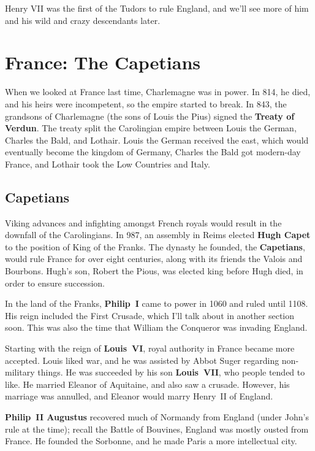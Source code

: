 Henry VII was the first of the Tudors to rule England,
and we'll see more of him and his wild and crazy descendants later.

\section{France: The Capetians}

When we looked at France last time, Charlemagne was in power.
In 814, he died, and his heirs were incompetent, so the empire started to break.
In 843, the grandsons of Charlemagne (the sons of Louis the Pius) signed the \textbf{Treaty of Verdun}.
The treaty split the Carolingian empire between Louis the German, Charles the Bald, and Lothair.
Louis the German received the east, which would eventually become the kingdom of Germany,
Charles the Bald got modern-day France,
and Lothair took the Low Countries and Italy.

\subsection*{Capetians}

Viking advances and infighting amongst French royals would result in the downfall of the Carolingians.
In 987, an assembly in Reims elected \textbf{Hugh Capet} to the position of King of the Franks.
The dynasty he founded, the \textbf{Capetians}, would rule France for over eight centuries,
along with its friends the Valois and Bourbons.
Hugh's son, Robert the Pious, was elected king before Hugh died, in order to ensure succession.

In the land of the Franks, \textbf{Philip~I} came to power in 1060 and ruled until 1108.
His reign included the First Crusade, which I'll talk about in another section soon.
This was also the time that William the Conqueror was invading England.

Starting with the reign of \textbf{Louis~VI}, royal authority in France became more accepted.
Louis liked war, and he was assisted by Abbot Suger regarding non-military things.
He was succeeded by his son \textbf{Louis~VII}, who people tended to like.
He married Eleanor of Aquitaine, and also saw a crusade.
However, his marriage was annulled, and Eleanor would marry Henry~II of England.

\textbf{Philip~II Augustus} recovered much of Normandy from England (under John's rule at the time);
recall the Battle of Bouvines, England was mostly ousted from France.
He founded the Sorbonne, and he made Paris a more intellectual city.

